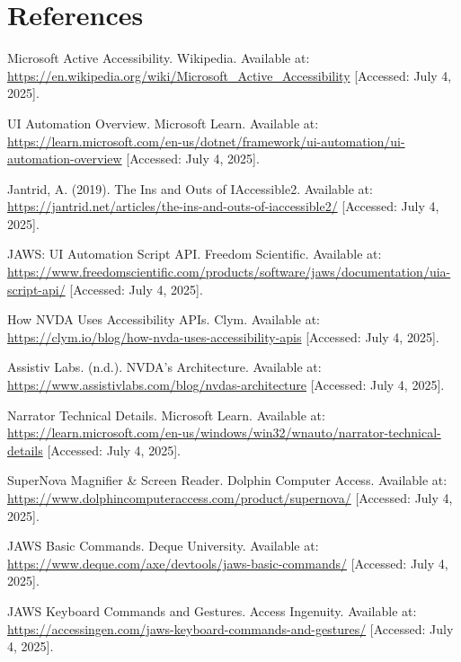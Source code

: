 \section{References}
\begin{thebibliography}{99}

 Microsoft Active Accessibility. Wikipedia. Available at: \url{https://en.wikipedia.org/wiki/Microsoft_Active_Accessibility} [Accessed: July 4, 2025].

 UI Automation Overview. Microsoft Learn. Available at: \url{https://learn.microsoft.com/en-us/dotnet/framework/ui-automation/ui-automation-overview} [Accessed: July 4, 2025].

 Jantrid, A. (2019). The Ins and Outs of IAccessible2. Available at: \url{https://jantrid.net/articles/the-ins-and-outs-of-iaccessible2/} [Accessed: July 4, 2025].

 JAWS: UI Automation Script API. Freedom Scientific. Available at: \url{https://www.freedomscientific.com/products/software/jaws/documentation/uia-script-api/} [Accessed: July 4, 2025].

 How NVDA Uses Accessibility APIs. Clym. Available at: \url{https://clym.io/blog/how-nvda-uses-accessibility-apis} [Accessed: July 4, 2025].

 Assistiv Labs. (n.d.). NVDA's Architecture. Available at: \url{https://www.assistivlabs.com/blog/nvdas-architecture} [Accessed: July 4, 2025].

 Narrator Technical Details. Microsoft Learn. Available at: \url{https://learn.microsoft.com/en-us/windows/win32/wnauto/narrator-technical-details} [Accessed: July 4, 2025].

 SuperNova Magnifier \& Screen Reader. Dolphin Computer Access. Available at: \url{https://www.dolphincomputeraccess.com/product/supernova/} [Accessed: July 4, 2025].

 JAWS Basic Commands. Deque University. Available at: \url{https://www.deque.com/axe/devtools/jaws-basic-commands/} [Accessed: July 4, 2025].

 JAWS Keyboard Commands and Gestures. Access Ingenuity. Available at: \url{https://accessingen.com/jaws-keyboard-commands-and-gestures/} [Accessed: July 4, 2025].


\end{thebibliography}
